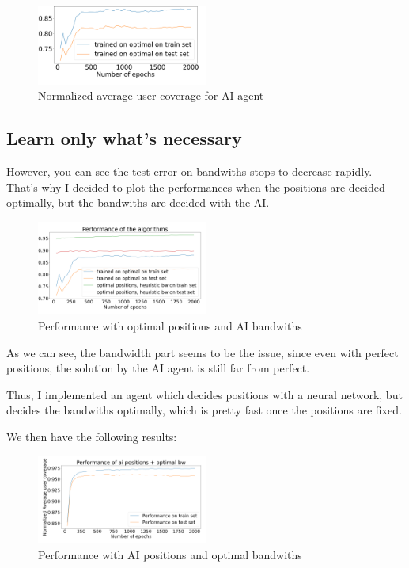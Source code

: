 \documentclass[letterpaper]{article}
\begin{document}
\begin{figure}[H]
    \centering
    \includegraphics[width=0.5\textwidth]{images/bilan_en _fonction epochs.png}
    \caption{Normalized average user coverage for AI agent}
\end{figure}

\subsection{Learn only what's necessary}

However, you can see the test error on bandwiths stops to decrease rapidly.
That's why I decided to plot the performances when the positions are decided optimally, but the bandwiths are decided with the AI.

\begin{figure}[H]
    \centering
    \includegraphics[width=0.5\textwidth]{images/bilan_en _fonction epochs_aibw.png}
    \caption{Performance with optimal positions and AI bandwiths}
\end{figure}

As we can see, the bandwidth part seems to be the issue, since even with perfect positions, the solution by the AI agent
is still far from perfect.

Thus, I implemented an agent which decides positions with a neural network, but decides the bandwiths optimally,
which is pretty fast once the positions are fixed.

We then have the following results:

\begin{figure}[H]
    \centering
    \includegraphics[width=0.5\textwidth]{images/mix_results.png}
    \caption{Performance with AI positions and optimal bandwiths}
\end{figure}
\end{document}
